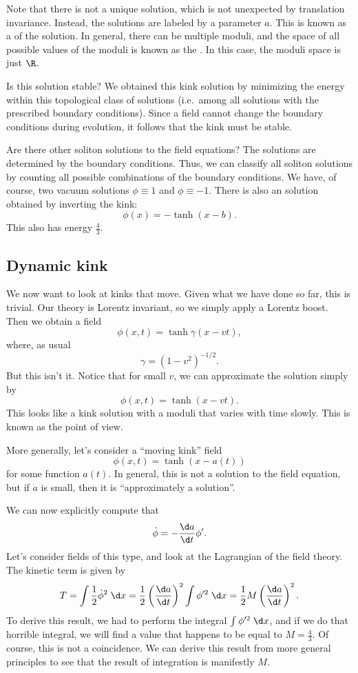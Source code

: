 \documentclass[a4paper]{article}
\begin{document}
Note that there is not a unique solution, which is not unexpected by translation invariance. Instead, the solutions are labeled by a parameter $a$. This is known as a  of the solution. In general, there can be multiple moduli, and the space of all possible values of the moduli is known as the . In this case, the moduli space is just $\R$.

Is this solution stable? We obtained this kink solution by minimizing the energy within this topological class of solutions (i.e.\ among all solutions with the prescribed boundary conditions). Since a field cannot change the boundary conditions during evolution, it follows that the kink must be stable.

Are there other soliton solutions to the field equations? The solutions are determined by the boundary conditions. Thus, we can classify all soliton solutions by counting all possible combinations of the boundary conditions. We have, of course, two vacuum solutions $\phi \equiv 1$ and $\phi \equiv -1$. There is also an  solution obtained by inverting the kink:
\[
  \phi(x) = - \tanh (x - b).
\]
This also has energy $\frac{4}{3}$.

\subsection{Dynamic kink}
We now want to look at kinks that move. Given what we have done so far, this is trivial. Our theory is Lorentz invariant, so we simply apply a Lorentz boost. Then we obtain a field
\[
  \phi(x, t) = \tanh \gamma (x - vt),
\]
where, as usual
\[
  \gamma = (1 - v^2)^{-1/2}.
\]
But this isn't it. Notice that for small $v$, we can approximate the solution simply by
\[
  \phi(x, t) = \tanh (x - vt).
\]
This looks like a kink solution with a moduli that varies with time slowly. This is known as the  point of view.

More generally, let's consider a ``moving kink'' field
\[
  \phi(x, t) = \tanh (x - a(t))
\]
for some function $a(t)$. In general, this is not a solution to the field equation, but if $\dot{a}$ is small, then it is ``approximately a solution''.

We can now explicitly compute that
\[
  \dot{\phi} = - \frac{\d a}{\d t} \phi'.
\]
Let's consider fields of this type, and look at the Lagrangian of the field theory. The kinetic term is given by
\[
  T = \int \frac{1}{2} \dot{\phi}^2\;\d x = \frac{1}{2} \left(\frac{\d a}{\d t}\right)^2 \int \phi'^2 \;\d x = \frac{1}{2} M \left(\frac{\d a}{\d t}\right)^2.
\]
To derive this result, we had to perform the integral $\int \phi'^2 \;\d x$, and if we do that horrible integral, we will find a value that happens to be equal to $M = \frac{4}{3}$. Of course, this is not a coincidence. We can derive this result from more general principles to see that the result of integration is manifestly $M$.
\end{document}
